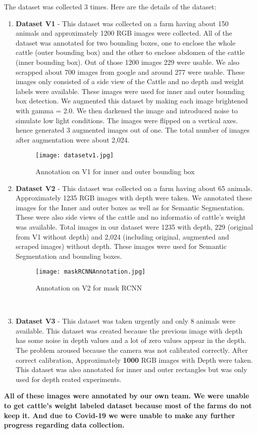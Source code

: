 The dataset was collected 3 times. Here are the details of the dataset:
\begin{enumerate}
\item \textbf{Dataset V1} - This dataset was collected on a farm having about 150 animals and approximately 1200 RGB images were collected. All of the dataset was annotated for two bounding boxes, one to enclose the whole cattle (outer bounding box) and the other to enclose abdomen of the cattle (inner bounding box). Out of those 1200 images 229 were usable. We also scrapped about 700 images from google and around 277 were usable. These images only consisted of a side view of the Cattle and no depth and weight labels were available. These images were used for inner and outer bounding box detection. We augmented this dataset by making each image brightened with gamma = 2.0. We then darkened the image and introduced noise to simulate low light conditions. The images were flipped on a vertical axes. hence generated 3 augmented images out of one. The total number of images after augmentation were about 2,024.
\begin{figure}[h]
\centering
\texttt{[image: datasetv1.jpg]}
\caption{Annotation on V1 for inner and outer bounding box}
\end{figure}


\item \textbf{Dataset V2} - This dataset was collected on a farm having about 65 animals. Approximately 1235 RGB images with depth were taken. We annotated these images for the Inner and outer boxes as well as for Semantic Segmentation. These were also side views of the cattle and no informatio of cattle's weight was available. Total images in our dataset were 1235 with depth, 229 (original from V1 without depth) and 2,024 (including original, augmented and scraped images) without depth. These images were used for Semantic Segmentation and bounding boxes. 
\pagebreak 
\begin{figure}[h]
\centering
\texttt{[image: maskRCNNAnnotation.jpg]}
\caption{Annotation on V2 for mask RCNN}
\end{figure} 
\\

\item  \textbf{Dataset V3} - This dataset was taken urgently and only 8 animals were available. This dataset was created because the previous image with depth has some noise in depth values and a lot of zero values appear in the depth. The problem aroused because the camera was not calibrated correctly. After correct calibration, Approximately \textbf{1000} RGB images with Depth were taken. This dataset was also annotated for inner and outer rectangles but was only used for depth reated experiments. 


\end{enumerate}
\textbf{All of these images were annotated by our own team. We were unable to get cattle's weight labeled dataset because most of the farms do not keep it. And due to Covid-19 we were unable to make any further progress regarding data collection.}

